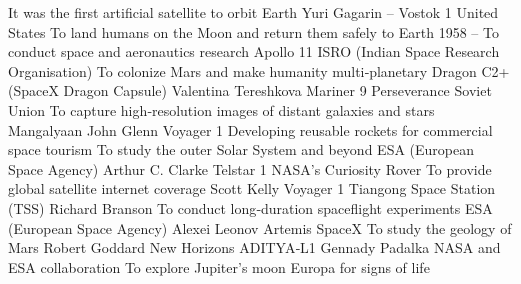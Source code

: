 \answerkey
{} It was the first artificial satellite to orbit Earth
 Yuri Gagarin – Vostok 1
 United States
 To land humans on the Moon and return them safely to Earth
 1958 – To conduct space and aeronautics research
 Apollo 11
 ISRO (Indian Space Research Organisation)
 To colonize Mars and make humanity multi‑planetary
 Dragon C2+ (SpaceX Dragon Capsule)
 Valentina Tereshkova
 Mariner 9
 Perseverance
 Soviet Union
 To capture high‑resolution images of distant galaxies and stars
 Mangalyaan
 John Glenn
 Voyager 1
 Developing reusable rockets for commercial space tourism
 To study the outer Solar System and beyond
 ESA (European Space Agency)
 Arthur C. Clarke
 Telstar 1
 NASA's Curiosity Rover
 To provide global satellite internet coverage
 Scott Kelly
 Voyager 1
 Tiangong Space Station (TSS)
 Richard Branson
 To conduct long‑duration spaceflight experiments
 ESA (European Space Agency)
 Alexei Leonov
 Artemis
 SpaceX
 To study the geology of Mars
 Robert Goddard
 New Horizons
 ADITYA‑L1
 Gennady Padalka
 NASA and ESA collaboration
 To explore Jupiter's moon Europa for signs of life
\endanswerkey